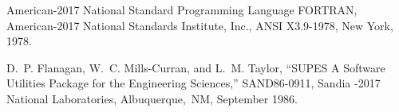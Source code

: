 \begin{thebibliography}{999}

\filbreak{} American-2017 National Standard Programming
                        Language FORTRAN,
                        American-2017 National Standards Institute, Inc.,
                        ANSI X3.9-1978, New York, 1978. 

\filbreak{}
D.~P. Flanagan, W.~C. Mills-Curran, and L.~M. Taylor, ``{SUPES} A Software
  Utilities Package for the Engineering Sciences,'' SAND86-0911, Sandia
 -2017 National Laboratories, Albuquerque,~NM, September 1986.

\end{thebibliography}
